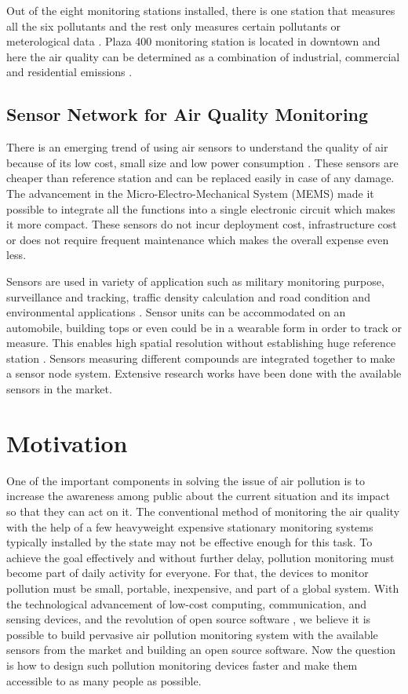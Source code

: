 Out of the eight monitoring stations installed, there is one station that measures all the six pollutants and the rest only measures certain pollutants or meterological data \cite{Environment2016}. Plaza 400 monitoring station is located in downtown and here the air quality can be determined as a combination of industrial, commercial and residential emissions \cite{Authority2011}.


\subsection{Sensor Network for Air Quality Monitoring}

There is an emerging trend of using air sensors to understand the quality of air because of its low cost, small size and low power consumption \cite{Sun2016}. These sensors are cheaper than reference station and can be replaced easily in case of any damage. The advancement in the Micro-Electro-Mechanical System (MEMS) made it possible to integrate all the functions into a single electronic circuit which makes it more compact. These sensors do not incur deployment cost, infrastructure cost or does not require frequent maintenance which makes the overall expense even less.
\par

Sensors are used in variety of application such as military monitoring purpose, surveillance and tracking, traffic density calculation and road condition and environmental applications \cite{Kadri2013}. Sensor units can be accommodated on an automobile, building tops or even could be in a wearable form in order to track or measure. This enables high spatial resolution without establishing huge reference station \cite{Nodes2015}. Sensors measuring different compounds are integrated together to make a sensor node system. Extensive research works have been done with the available sensors in the market.

\section{Motivation}

One of the important components in solving the issue of air pollution is to increase the awareness among public about the current situation and its impact so that they can act on it. The conventional method of monitoring the air quality with the help of a few heavyweight expensive stationary monitoring systems typically installed by the state may not be effective enough for this task. To achieve the goal effectively and without further delay, pollution monitoring must become part of daily activity for everyone. For that, the devices to monitor pollution must be small, portable, inexpensive, and part of a global system. With the technological advancement of low-cost computing, communication, and sensing devices, and the revolution of open source software \cite{Anthes2016}, we believe it is possible to build pervasive air pollution monitoring system with the available sensors from the market and building an open source software. Now the question is how to design such pollution monitoring devices faster and make them accessible to as many people as possible. 

